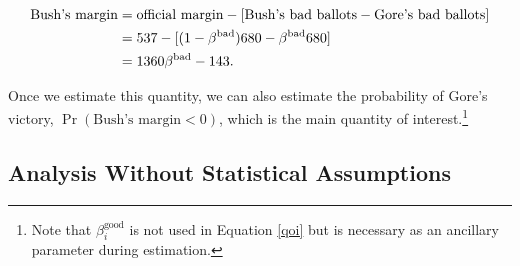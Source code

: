 \documentclass[11pt,titlepage]{article}
\newcommand{\bb}{\beta^{\text{bad}}}
\newcommand{\bg}{\beta^{\text{good}}}
\newcommand{\vs}{\vspace{-\baselineskip}}
\begin{document}
\vs
{}\baselineskip
\begin{align}
  \text{Bush's margin} & = \text{official margin}
  - [\text{Bush's bad ballots} - \text{Gore's bad ballots}] \notag\\
  & = 537 - [(1-\bb)680-\bb 680]\notag\\
  & = 1360 \bb - 143. \label{qoi}
\end{align}

\vs
{}\baselineskip
\noindent Once we estimate this quantity, we can also estimate the probability
of Gore's victory, $\Pr(\text{Bush's margin}<0)$, which is the main
quantity of interest.\footnote{Note that $\bg_i$ is not used in
  Equation \ref{qoi} but is necessary as an ancillary parameter during
  estimation.}

\subsection{Analysis Without Statistical Assumptions} \label{s:noassump}
\end{document}
